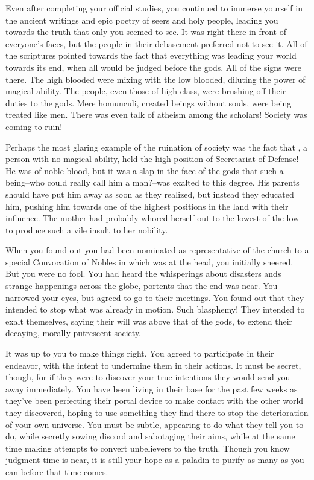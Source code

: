 \documentclass[char]{guildcamp3}
\begin{document}
Even after completing your official studies, you continued to immerse yourself in the ancient writings and epic poetry of seers and holy people, leading you towards the truth that only you seemed to see. It was right there in front of everyone's faces, but the people in their debasement preferred not to see it. All of the scriptures pointed towards the fact that everything was leading your world towards its end, when all would be judged before the gods. All of the signs were there. The high blooded were mixing with the low blooded, diluting the power of magical ability. The people, even those of high class, were brushing off their duties to the gods. Mere homunculi, created beings without souls, were being treated like men. There was even talk of atheism among the scholars! Society was coming to ruin!

Perhaps the most glaring example of the ruination of society was the fact that \cNobleOne{}, a person with no magical ability, held the high position of Secretariat of Defense! He was of noble blood, but it was a slap in the face of the gods that such a being--who could really call him a man?--was exalted to this degree. His parents should have put him away as soon as they realized, but instead they educated him, pushing him towards one of the highest positions in the land with their influence. The mother had probably whored herself out to the lowest of the low to produce such a vile insult to her nobility.

When you found out you had been nominated as representative of the church to a special Convocation of Nobles in which \cNobleOne{\they} was at the head, you initially sneered. But you were no fool. You had heard the whisperings about disasters ands strange happenings across the globe, portents that the end was near. You narrowed your eyes, but agreed to go to their meetings. You found out that they intended to stop what was already in motion. Such blasphemy! They intended to exalt themselves, saying their will was above that of the gods, to extend their decaying, morally putrescent society.

It was up to you to make things right. You agreed to participate in their endeavor, with the intent to undermine them in their actions. It must be secret, though, for if they were to discover your true intentions they would send you away immediately. You have been living in their base for the past few weeks as they've been perfecting their portal device to make contact with the other world they discovered, hoping to use something they find there to stop the deterioration of your own universe. You must be subtle, appearing to do what they tell you to do, while secretly sowing discord and sabotaging their aims, while at the same time making attempts to convert unbelievers to the truth. Though you know judgment time is near, it is still your hope as a paladin to purify as many as you can before that time comes.
\end{document}
